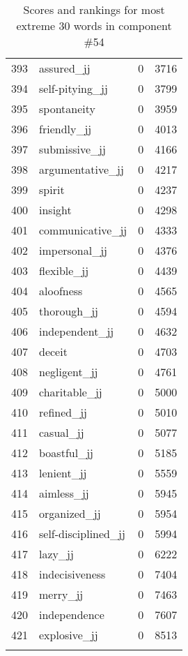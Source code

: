 \begin{longtable}[!htbp]{| rlr@{.}l |}
    393 & assured\_jj & 0 & 3716 \\
    394 & self-pitying\_jj & 0 & 3799 \\
    395 & spontaneity & 0 & 3959 \\
    396 & friendly\_jj & 0 & 4013 \\
    397 & submissive\_jj & 0 & 4166 \\
    398 & argumentative\_jj & 0 & 4217 \\
    399 & spirit & 0 & 4237 \\
    400 & insight & 0 & 4298 \\
    401 & communicative\_jj & 0 & 4333 \\
    402 & impersonal\_jj & 0 & 4376 \\
    403 & flexible\_jj & 0 & 4439 \\
    404 & aloofness & 0 & 4565 \\
    405 & thorough\_jj & 0 & 4594 \\
    406 & independent\_jj & 0 & 4632 \\
    407 & deceit & 0 & 4703 \\
    408 & negligent\_jj & 0 & 4761 \\
    409 & charitable\_jj & 0 & 5000 \\
    410 & refined\_jj & 0 & 5010 \\
    411 & casual\_jj & 0 & 5077 \\
    412 & boastful\_jj & 0 & 5185 \\
    413 & lenient\_jj & 0 & 5559 \\
    414 & aimless\_jj & 0 & 5945 \\
    415 & organized\_jj & 0 & 5954 \\
    416 & self-disciplined\_jj & 0 & 5994 \\
    417 & lazy\_jj & 0 & 6222 \\
    418 & indecisiveness & 0 & 7404 \\
    419 & merry\_jj & 0 & 7463 \\
    420 & independence & 0 & 7607 \\
    421 & explosive\_jj & 0 & 8513 \\
    \hline
    \caption{Scores and rankings for most extreme 30 words in component \#54} \\
\end{longtable}

